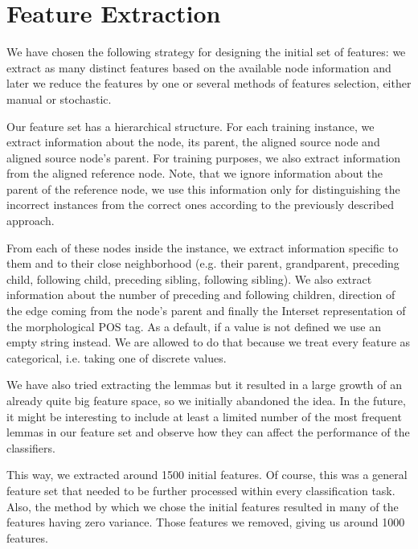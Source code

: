 \section{Feature Extraction}
\label{sec:feat_extract}


We have chosen the following strategy for designing the initial set of features:
we extract as many distinct features based on the available node information
and later we reduce the features by one or several methods
of features selection, either manual or stochastic.

Our feature set has a hierarchical structure. For each training instance, we extract
information about the node, its parent, the aligned source node and aligned source node's
parent. For training purposes, we also extract information from the aligned reference
node. Note, that we ignore information about the parent of the reference node, we
use this information only for distinguishing the incorrect instances from the correct ones
according to the previously described approach.

From each of these  nodes inside the instance, we extract information
specific to them and to their close neighborhood (e.g. their parent, grandparent,
preceding child, following child, preceding sibling, following sibling). We
also extract information about the number of preceding and following children,
direction of the edge coming from the node's parent and finally the Interset representation
of the morphological POS tag. As a default, if a value is not defined we use an empty string instead.
We are allowed to do that because we treat every feature as categorical, i.e. taking one of discrete values.

We have also tried extracting the lemmas but it resulted in a
large growth of an already quite big feature space, so we initially abandoned the idea.
In the future, it might be interesting to include at least a limited number of the most frequent lemmas in our
feature set and observe how they can affect the performance of the classifiers.

This way, we extracted around 1500 initial features. Of course, this was a general feature
set that needed to be further processed within every classification task. Also, the method
by which we chose the initial features resulted in many of the features having zero
variance. Those features we removed, giving us around 1000 features.


